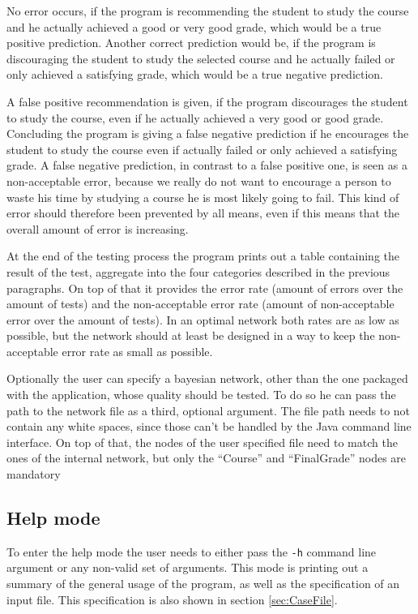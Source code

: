 \documentclass[%
	pdftex,
	oneside,        %
	11pt,           %
	parskip=half,   %
	headsepline,    %
	footsepline,    %
	abstracton,     %
	USenglish,      %
	a4paper,        %
]{report}
\begin{document}
No error occurs, if the program is recommending the student to study the course and he actually achieved a good or very good grade, which would be a true positive prediction. Another correct prediction would be, if the program is discouraging the student to study the selected course and he actually failed or only achieved a satisfying grade, which would be a true negative prediction.

A false positive recommendation is given, if the program discourages the student to study the course, even if he actually achieved a very good or good grade. Concluding the program is giving a false negative prediction if he encourages the student to study the course even if actually failed or only achieved a satisfying grade. A false negative prediction, in contrast to a false positive one, is seen as a non-acceptable error, because we really do not want to encourage a person to waste his time by studying a course he is most likely going to fail. This kind of error should therefore been prevented by all means, even if this means that the overall amount of error is increasing.

At the end of the testing process the program prints out a table containing the result of the test, aggregate into the four categories described in the previous paragraphs. On top of that it provides the error rate (amount of errors over the amount of tests) and the non-acceptable error rate (amount of non-acceptable error over the amount of tests). In an optimal network both rates are as low as possible, but the network should at least be designed in a way to keep the non-acceptable error rate as small as possible.

Optionally the user can specify a bayesian network, other than the one packaged with the application, whose quality should be tested. To do so he can pass the path to the network file as a third, optional argument. The file path needs to not contain any white spaces, since those can't be handled by the Java command line interface. On top of that, the nodes of the user specified file need to match the ones of the internal network, but only the \enquote{Course} and \enquote{FinalGrade} nodes are mandatory

\subsection{Help mode}
\label{sec:Help}
To enter the help mode the user needs to either pass the \texttt{-h} command line argument or any non-valid set of arguments. This mode is printing out a summary of the general usage of the program, as well as the specification of an input file. This specification is also shown in section \vref{sec:CaseFile}.
\end{document}
